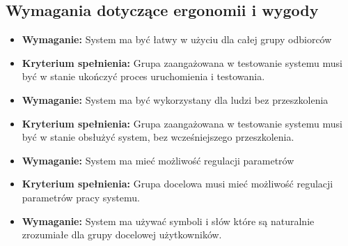 \documentclass{article}
\begin{document}
\subsection{Wymagania dotyczące ergonomii i wygody}
\begin{itemize}
\item \textbf{Wymaganie:} System ma być łatwy w użyciu dla całej grupy odbiorców 
\item \textbf{Kryterium spełnienia:} Grupa zaangażowana w testowanie systemu musi być w stanie ukończyć proces uruchomienia i testowania.\\
\end{itemize}
\begin{itemize}
\item \textbf{Wymaganie:} System ma być wykorzystany dla ludzi bez przeszkolenia
\item \textbf{Kryterium spełnienia:} Grupa zaangażowana w testowanie systemu musi być w stanie obsłużyć system, bez wcześniejszego przeszkolenia.\\
\end{itemize}
\begin{itemize}
\item \textbf{Wymaganie:} System ma mieć możliwość regulacji parametrów
\item \textbf{Kryterium spełnienia:} Grupa docelowa musi mieć możliwość regulacji parametrów pracy systemu.\\
\end{itemize}
\begin{itemize}
\item \textbf{Wymaganie:} System ma używać symboli i słów które są naturalnie zrozumiałe dla grupy docelowej użytkowników.
\end{itemize}
\end{document}
